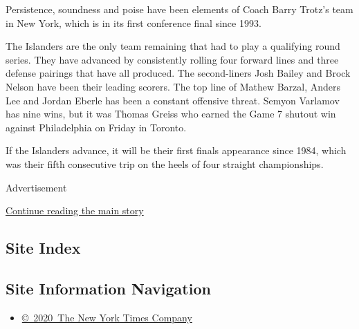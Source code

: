Persistence, soundness and poise have been elements of Coach Barry
Trotz's team in New York, which is in its first conference final since
1993.

The Islanders are the only team remaining that had to play a qualifying
round series. They have advanced by consistently rolling four forward
lines and three defense pairings that have all produced. The
second-liners Josh Bailey and Brock Nelson have been their leading
scorers. The top line of Mathew Barzal, Anders Lee and Jordan Eberle has
been a constant offensive threat. Semyon Varlamov has nine wins, but it
was Thomas Greiss who earned the Game 7 shutout win against Philadelphia
on Friday in Toronto.

If the Islanders advance, it will be their first finals appearance since
1984, which was their fifth consecutive trip on the heels of four
straight championships.

Advertisement

\protect\hyperlink{after-bottom}{Continue reading the main story}

\hypertarget{site-index}{%
\subsection{Site Index}\label{site-index}}

\hypertarget{site-information-navigation}{%
\subsection{Site Information
Navigation}\label{site-information-navigation}}

\begin{itemize}
\tightlist
\item
  \href{https://help.nytimes3xbfgragh.onion/hc/en-us/articles/115014792127-Copyright-notice}{©~2020~The
  New York Times Company}
\end{itemize}


